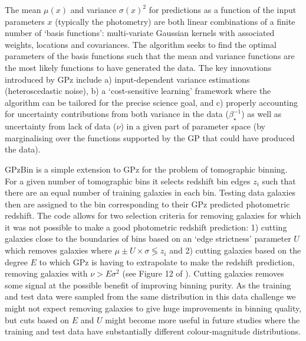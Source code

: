 \documentclass[twocolumn,twocolappendix]{aastex63}
\begin{document}
The mean $\mu(x)$ and variance $\sigma(x)^2$ for predictions as a function of
the input parameters $x$ (typically the photometry) are both linear combinations
of a finite number of `basis functions': multi-variate Gaussian kernels with
associated weights, locations and covariances. The algorithm seeks to find the
optimal parameters of the basis functions such that the mean and variance
functions are the most likely functions to have generated the data. The key
innovations introduced by GPz include a) input-dependent variance estimations
(heteroscedastic noise), b) a `cost-sensitive learning' framework where the
algorithm can be tailored for the precise science goal, and c) properly
accounting for uncertainty contributions from both variance in the data
($\beta^{-1}_{\star}$) as well as uncertainty from lack of data ($\nu$) in a
given part of parameter space (by marginalising over the functions supported by
the GP that could have produced the data).



GPzBin is a simple extension to GPz for the problem of tomographic binning. For
a given number of tomographic bins it selects redshift bin edges $z_{i}$ such
that there are an equal number of training galaxies in each bin. Testing data
galaxies then are assigned to the bin corresponding to their GPz predicted
photometric redshift. The code allows for two selection criteria for removing
galaxies for which it was not possible to make a good photometric redshift
prediction: 1) cutting galaxies close to the boundaries of bins based on an
`edge strictness' parameter $U$ which removes galaxies where $\mu\pm U \times
\sigma \lessgtr z_i$ and 2) cutting galaxies based on the degree $E$ to which
GPz is having to extrapolate to make the redshift prediction, removing galaxies
with $\nu>E\sigma^2$ (see Figure 12 of \citealp{Hatfield2020}). Cutting galaxies
removes some signal at the possible benefit of improving binning purity. As the
training and test data were sampled from the same distribution in this data
challenge we might not expect removing galaxies to give huge improvements in
binning quality, but cuts based on $E$ and $U$ might become more useful in
future studies where the training and test data have substantially different
colour-magnitude distributions.
\end{document}
